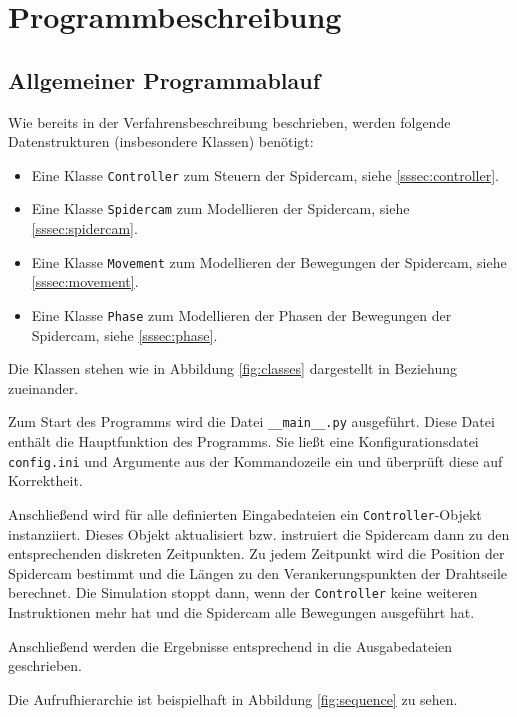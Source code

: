 \section{Programmbeschreibung}
\label{sec:programmbeschreibung}

\subsection{Allgemeiner Programmablauf}
\label{ssec:allgemeiner_programmablauf}

Wie bereits in der Verfahrensbeschreibung beschrieben, werden folgende Datenstrukturen (insbesondere Klassen) benötigt:
\begin{itemize}
    \item Eine Klasse \texttt{Controller} zum Steuern der Spidercam, siehe \ref{sssec:controller}.
    \item Eine Klasse \texttt{Spidercam} zum Modellieren der Spidercam, siehe \ref{sssec:spidercam}.
    \item Eine Klasse \texttt{Movement} zum Modellieren der Bewegungen der Spidercam, siehe \ref{sssec:movement}.
    \item Eine Klasse \texttt{Phase} zum Modellieren der Phasen der Bewegungen der Spidercam, siehe \ref{sssec:phase}.
\end{itemize}

Die Klassen stehen wie in Abbildung \ref{fig:classes} dargestellt in Beziehung zueinander.

Zum Start des Programms wird die Datei \texttt{\_\_main\_\_.py} ausgeführt.
Diese Datei enthält die Hauptfunktion des Programms.
Sie ließt eine Konfigurationsdatei \texttt{config.ini} und Argumente aus der Kommandozeile ein und überprüft diese auf Korrektheit.

Anschließend wird für alle definierten Eingabedateien ein \texttt{Controller}-Objekt instanziiert.
Dieses Objekt aktualisiert bzw. instruiert die Spidercam dann zu den entsprechenden diskreten Zeitpunkten.
Zu jedem Zeitpunkt wird die Position der Spidercam bestimmt und die Längen zu den Verankerungspunkten der Drahtseile berechnet.
Die Simulation stoppt dann, wenn der \texttt{Controller} keine weiteren Instruktionen mehr hat und die Spidercam alle Bewegungen ausgeführt hat.

Anschließend werden die Ergebnisse entsprechend in die Ausgabedateien geschrieben.

Die Aufrufhierarchie ist beispielhaft in Abbildung \ref{fig:sequence} zu sehen.

